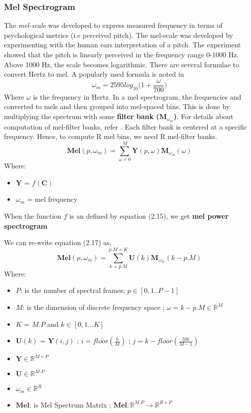 \subsubsection{Mel Spectrogram}
\label{mel}

The \textit{mel-scale} was developed to express measured frequency in terms of psychological metrics (i.e perceived pitch). The mel-scale was developed
by experimenting with the human ears interpretation of a pitch. The experiment showed that the pitch is linearly perceived in the frequency range 0-1000 Hz. Above
1000 Hz, the scale becomes logarithmic. There are several formulae to convert Hertz to mel. A popularly used formula is noted in \cite{speech}
\begin{equation}
\omega_{m} = 2595log_{10}\bigg(1+\frac{ \omega }{700}\bigg)
\end{equation}
Where $\omega$ is the frequency in Hertz. In a mel spectrogram, the frequencies and converted to mels and then grouped into mel-spaced bins. This is done by multiplying the spectrum with some \textbf{filter bank ($\textbf{M}_{\omega_{m}}$)}. For details about computation of mel-filter banks, refer \cite{mel}. Each filter bank is centered at a specific frequency. Hence, to compute R mel bins, we need R mel-filter banks. 
\begin{equation}
\textbf{Mel}(p,\omega_{m}) = \displaystyle\sum_{ \omega = 0}^{M}\textbf{Y}(p, \omega)\textbf{M}_{\omega_{m}}(\omega)
\end{equation}
Where:
\begin{itemize}[label=]
    \setlength\itemsep{0em}
    \item $\textbf{Y}$ = $f(\textbf{C})$
    \item $\omega_{m}$ = mel frequency
\end{itemize}    
When the function $f$ is an defined by equation (2.15), we get \textbf{mel power spectrogram}
\bigskip

\noindent We can re-write equation (2.17) as, 
\begin{equation}
\textbf{Mel}(p,\omega_{m}) = \displaystyle\sum_{k=p.M}^{p.M + K}\textbf{U}(k)\textbf{M}_{\omega_{m}}(k-p.M)
\end{equation}
Where:
\begin{itemize}[label=]
    \setlength\itemsep{0em}
    \item $P$: is the number of spectral frames; $p \in [0,1..P-1]$ 
    \item $M$: is the dimension of discrete frequency space ; $\omega = k-p.M \in \mathbb{R}^{M}$
    \item $K$ = $M.P$ and $k \in [0,1...K]$
    \item $\textbf{U}(k)$ = $\textbf{Y}(i,j)$ ; $i = floor(\frac{k}{M})$ ; $j = k-floor(\frac{Mk}{M-1})$
    \item $\textbf{Y} \in \mathbb{R}^{M \times P}$
    \item $\textbf{U} \in \mathbb{R}^{M.P}$
    \item $\omega_{m} \in  \mathbb{R}^{R}$
    \item $\textbf{Mel}$: is Mel Spectrum Matrix ; $\textbf{Mel} : \mathbb{R}^{M.P} \rightarrow \mathbb{R}^{R \times P}$
\end{itemize}

